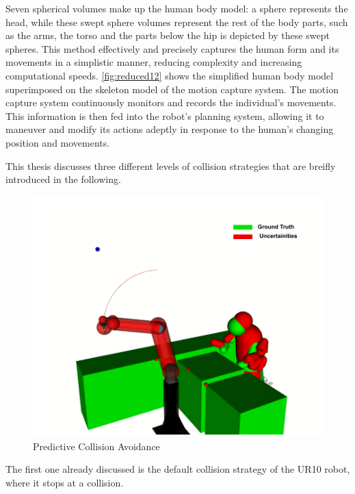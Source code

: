 Seven spherical volumes make up the human body model: a sphere represents the head, while these swept sphere volumes represent the rest of the body parts, such as the arms, the torso and the parts below the hip is depicted by these swept spheres. This method effectively and precisely captures the human form and its movements in a simplistic manner, reducing complexity and increasing computational speeds. 
\autoref{fig:reduced12} shows the simplified human body model superimposed on the skeleton model of the motion capture system.
The motion capture system continuously monitors and records the individual's movements. This information is then fed into the robot's planning system, allowing it to maneuver and modify its actions adeptly in response to the human's changing position and movements.

This thesis discusses three different levels of collision strategies that are breifly introduced in the following.

\begin{figure}[!htbp]
	\centering
	\includegraphics[width=0.8\columnwidth]{images/uncertainities (1).pdf}
	\caption{Predictive Collision Avoidance}
	\label{fig:pred}
\end{figure}

The first one already discussed is the default collision strategy of the UR10 robot, where it stops at a collision.


